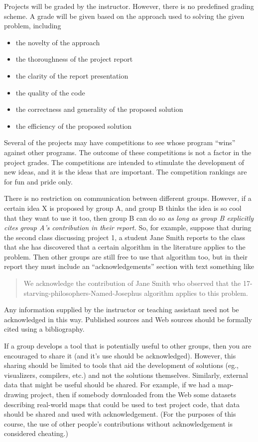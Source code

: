 Projects will be graded by the instructor.  However, there is no
predefined grading scheme.  A grade will be given based on the
approach used to solving the given problem, including
\begin{itemize}
\item the novelty of the approach
\item the thoroughness of the project report
\item the clarity of the report presentation
\item the quality of the code
\item the correctness and generality of the proposed solution
\item the efficiency of the proposed solution
\end{itemize}

Several of the projects may have competitions to see whose program
``wins'' against other programs.  The outcome of these competitions is
not a factor in the project grades.  The competitions are intended to
stimulate the development of new ideas, and it is the ideas that are
important.  The competition rankings are for fun and pride only.

There is no restriction on communication between different groups.
However, if a certain idea X is proposed by group A, and group B
thinks the idea is so cool that they want to use it too, then group
B can do so {\em as long as group B explicitly cites group A's
contribution in their report.}  So, for example, suppose that
during the second class discussing project 1, a student Jane Smith reports
to the class
that she has discovered that a certain algorithm in the literature
applies to the problem.  Then other groups are still free to use that
algorithm too, but in their report they must include an ``acknowledgements''
section with text something like
\begin{quotation}
We acknowledge the contribution of Jane Smith who observed that the
17-starving-philosophers-Named-Josephus algorithm applies to this
problem.
\end{quotation}
Any information supplied by the instructor or
teaching assistant need not be
acknowledged in this way.  Published sources and
Web sources should be formally cited using a bibliography.

If a group develops a tool that is potentially useful to other groups,
then you are encouraged to share it (and it's use should be
acknowledged).  However, this sharing should be limited to tools that
aid the development of solutions (eg., visualizers, compilers, etc.)
and not the solutions themselves.  Similarly, external data that might
be useful should be shared.  For example, if we had a map-drawing
project, then if somebody downloaded from the Web some datasets describing
real-world maps that could be used to test project code, that data
should be shared and used with acknowledgement.  (For the purposes
of this course, the use of other people's contributions without
acknowledgement is considered cheating.)

